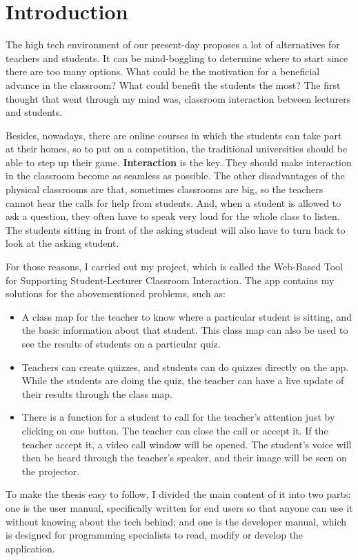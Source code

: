 \documentclass[a4paper, 11pt,openany]{book} %
\begin{document}
\chapter{Introduction}
The high tech environment of our present-day proposes a lot of alternatives for teachers and students. It can be mind-boggling to determine where to start since there are too many options. What could be the motivation for a beneficial advance in the classroom? What could benefit the students the most? The first thought that went through my mind was, classroom interaction between lecturers and students.\par 
Besides, nowadays, there are online courses in which the students can take part at their homes, so to put on a competition, the traditional universities should be able to step up their game. \textbf{Interaction} is the key. They should make interaction in the classroom become as seamless as possible. The other disadvantages of the physical classrooms are that, sometimes classrooms are big, so the teachers cannot hear the calls for help from students. And, when a student is allowed to ask a question, they often have to speak very loud for the whole class to listen. The students sitting in front of the asking student will also have to turn back to look at the asking student. \par 
For those reasons, I carried out my project, which is called the Web-Based Tool for Supporting Student-Lecturer Classroom Interaction. The app contains my solutions for the abovementioned problems, such as:
\begin{itemize}
    \item A class map for the teacher to know where a particular student is sitting, and the basic information about that student. This class map can also be used to see the results of students on a particular quiz.
    \item Teachers can create quizzes, and students can do quizzes directly on the app. While the students are doing the quiz, the teacher can have a live update of their results through the class map.
    \item There is a function for a student to call for the teacher's attention just by clicking on one button. The teacher can close the call or accept it. If the teacher accept it, a video call window will be opened. The student's voice will then be heard through the teacher's speaker, and their image will be seen on the projector.
\end{itemize}
To make the thesis easy to follow, I divided the main content of it into two parts: one is the user manual, specifically written for end users so that anyone can use it without knowing about the tech behind; and one is the developer manual, which is designed for programming specialists to read, modify or develop the application. 
\end{document}
